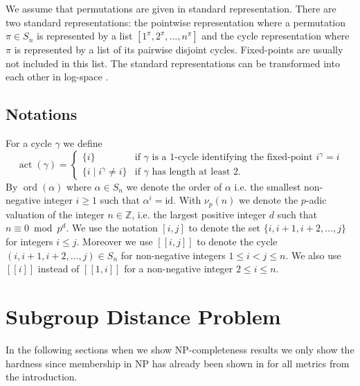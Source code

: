 \documentclass{article}
\newcommand{\llbracket}{[\![}
\newcommand{\rrbracket}{]\!]}
\DeclareMathOperator{\ord}{ord}
\DeclareMathOperator{\act}{act}
\begin{document}
We assume that permutations are given in standard representation. There are two standard representations: the pointwise representation where a permutation $\pi \in S_n$ is represented by a list $[1^\pi,2^\pi,\dots,n^\pi]$ and the cycle representation where $\pi$ is represented by a list of its pairwise disjoint cycles. Fixed-points are usually not included in this list. The standard representations can be transformed into each other in log-space \cite{cook}.

\subsection{Notations}
For a cycle $\gamma$ we define
\begin{displaymath}
\act(\gamma) = \begin{cases}
\{i\} & \text{if } \gamma \text{ is a 1-cycle identifying the fixed-point } i^\gamma = i\\
\{i \mid i^\gamma \neq i\} & \text{if } \gamma \text{ has length at least }2.
\end{cases}
\end{displaymath}
By $\ord(\alpha)$ where $\alpha \in S_n$ we denote the order of $\alpha$ i.e. the smallest non-negative integer $i \geq 1$ such that $\alpha^i = \mathrm{id}$. With $\nu_p(n)$ we denote the $p$-adic valuation of the integer $n \in \mathbb{Z}$, i.e. the largest positive integer $d$ such that $n \equiv 0 \bmod p^d$. We use the notation $[i,j]$ to denote the set $\{i,i+1,i+2,\dots,j\}$ for integers $i \leq j$. Moreover we use $\llbracket i,j \rrbracket$ to denote the cycle $(i,i+1,i+2,\dots,j) \in S_n$ for non-negative integers $1 \leq i < j \leq n$. We also use $\llbracket i \rrbracket$ instead of $\llbracket 1,i \rrbracket$ for a non-negative integer $2 \leq i \leq n$.

\section{Subgroup Distance Problem}\label{sectionSubgroupDistanceProblem}
In the following sections when we show {\sf NP}-completeness results we only show the hardness since membership in {\sf NP} has already been shown in \cite{buchheim} for all metrics from the introduction.
\end{document}
